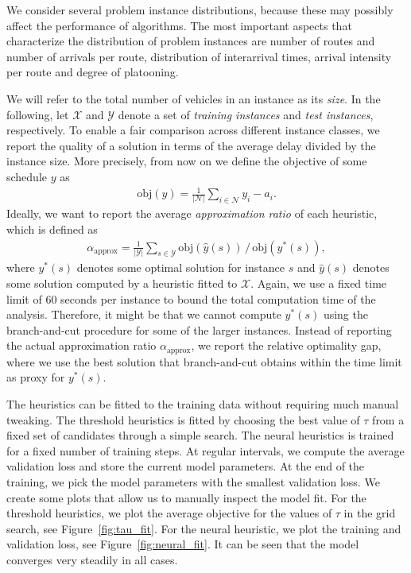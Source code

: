 \documentclass[a4paper]{article}
\theoremstyle{definition}
\theoremstyle{plain}
\begin{document}
We consider several problem instance distributions, because these may possibly
affect the performance of algorithms. The most important aspects that
characterize the distribution of problem instances are number of routes and
number of arrivals per route, distribution of interarrival times, arrival
intensity per route and degree of platooning.

We will refer to the total number of vehicles in an instance as its \textit{size}.
%
In the following, let $\mathcal{X}$ and $\mathcal{Y}$ denote a set of \textit{training instances}
and \textit{test instances}, respectively.
%
To enable a fair comparison across different instance classes, we report the
quality of a solution in terms of the average delay divided by the
instance size. More precisely, from now on we define the objective of some schedule $y$ as
\begin{align*}
  \textrm{obj}(y) = \frac{1}{|\mathcal{N}|} \sum_{i \in \mathcal{N}} y_{i} - a_{i} .
\end{align*}
%
Ideally, we want to report the average \textit{approximation ratio} of each
heuristic, which is defined as
\begin{align*}
  \alpha_{\text{approx}} = \frac{1}{|\mathcal{Y}|} \sum_{s \in \mathcal{Y}} \textrm{obj}(\hat{y}(s)) \, / \, \textrm{obj}(y^{*}(s)) ,
\end{align*}
where $y^{*}(s)$ denotes some optimal solution for instance $s$ and $\hat{y}(s)$
denotes some solution computed by a heuristic fitted to $\mathcal{X}$.
%
Again, we use a fixed time limit of 60 seconds per instance to bound the total
computation time of the analysis. Therefore, it might be that we cannot compute $y^{*}(s)$ using
the branch-and-cut procedure for some of the larger instances.
%
Instead of reporting the actual approximation ratio $\alpha_{\text{approx}}$, we report the
relative optimality gap, where we use the best solution that branch-and-cut
obtains within the time limit as proxy for $y^{*}(s)$.

The heuristics can be fitted to the training data without requiring much manual tweaking.
%
The threshold heuristics is fitted by choosing the best value of $\tau$ from a fixed set of candidates through a simple search.
The neural heuristics is trained for a fixed number of training steps. At regular intervals, we compute the average validation loss and store the current model parameters. At the end of the training, we pick the model parameters with the smallest validation loss.
%
We create some plots that allow us to manually inspect the model fit.
For the threshold heuristics, we plot the average objective for the values of
$\tau$ in the grid search, see Figure~\ref{fig:tau_fit}.
%
For the neural heuristic, we plot the training and validation loss, see
Figure~\ref{fig:neural_fit}. It can be seen that the model converges very steadily in all cases.
\end{document}
